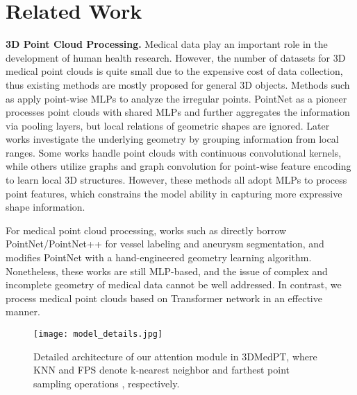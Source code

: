 \documentclass[10pt,twocolumn,letterpaper]{article}
\begin{document}
\section{Related Work}
\noindent \textbf{3D Point Cloud Processing.}
Medical data play an important role in the development of human health research.
However, the number of datasets for 3D medical point clouds is quite small due to the expensive cost of data collection, thus existing methods are mostly proposed for general 3D objects.
Methods such as \cite{qi2017pointnet, qi2017pointnet2, densepoint} apply point-wise MLPs to analyze the irregular points.
PointNet \cite{qi2017pointnet} as a pioneer processes point clouds with shared MLPs and further aggregates the information via pooling layers, but local relations of geometric shapes are ignored.
Later works \cite{qi2017pointnet2, GDANet, xu2020geometry, Xiang_2021_ICCV} investigate the underlying geometry by grouping information from local ranges.
Some works \cite{pointcnn, wu2019pointconv, thomas2019kpconv, wang2018deep} handle point clouds with continuous convolutional kernels, while others \cite{wang2019dynamic, grid-gcn, graphattn} utilize graphs and graph convolution for point-wise feature encoding to learn local 3D structures.
However, these methods all adopt MLPs to process point features, which constrains the model ability in capturing more expressive shape information.


For medical point cloud processing, works such as \cite{bizjak2020vascular, he2020learning} directly borrow PointNet/PointNet++ for vessel labeling and aneurysm segmentation, and \cite{astolfi2020tractogram} modifies PointNet with a hand-engineered geometry learning algorithm.
Nonetheless, these works are still MLP-based, and the issue of complex and incomplete geometry of medical data cannot be well addressed.
In contrast, we process medical point clouds based on Transformer network in an effective manner.


\begin{figure*}
\centering\texttt{[image: model\_details.jpg]}
\caption{
    Detailed architecture of our attention module in 3DMedPT, where KNN and FPS denote k-nearest neighbor and farthest point sampling operations \cite{qi2017pointnet2}, respectively.
} \label{fig:detailed_model}
\end{figure*}
\end{document}

